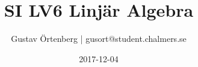\documentclass{article}
\title{SI LV6 Linjär Algebra}
\author{Gustav Örtenberg | \small{gusort@student.chalmers.se}}
\date{2017-12-04}
\begin{document}
\maketitle
\section{}


\section{}


\section{}


\section{}


\section{}


\section{}

\end{document}
